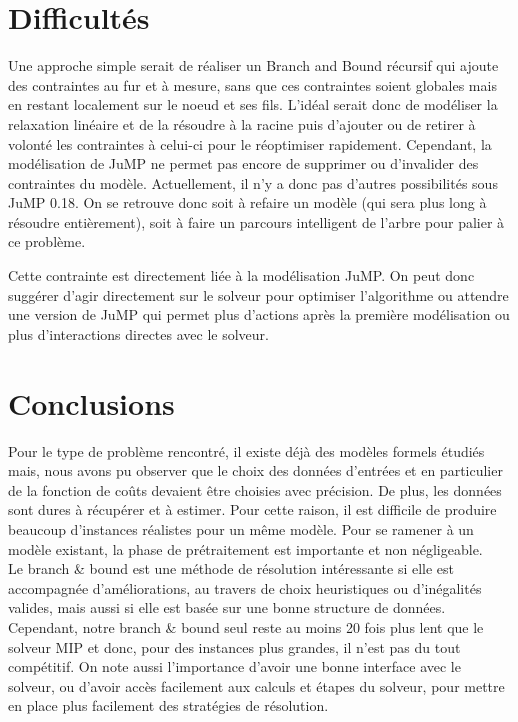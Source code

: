 \documentclass[a4paper,10pt]{article}
\begin{document}
\newpage
\section{Difficultés}
Une approche simple serait de réaliser un Branch and Bound récursif qui ajoute des contraintes au fur et à mesure, sans que ces contraintes soient globales mais en restant localement sur le noeud et ses fils. L'idéal serait donc de modéliser la relaxation linéaire et de la résoudre à la racine puis d'ajouter ou de retirer à volonté les contraintes à celui-ci pour le réoptimiser rapidement. Cependant, la modélisation de JuMP ne permet pas encore de supprimer ou d'invalider des contraintes du modèle. Actuellement, il n'y a donc pas d'autres possibilités sous JuMP 0.18. On se retrouve donc soit à refaire un modèle (qui sera plus long à résoudre entièrement), soit à faire un parcours intelligent de l'arbre pour palier à ce problème.

Cette contrainte est directement liée à la modélisation JuMP. On peut donc suggérer d'agir directement sur le solveur pour optimiser l'algorithme ou attendre une version de JuMP qui permet plus d'actions après la première modélisation ou plus d'interactions directes avec le solveur.

\section{Conclusions}

Pour le type de problème rencontré, il existe déjà des modèles formels étudiés mais, nous avons pu observer que le choix des données d'entrées et en particulier de la fonction de coûts devaient être choisies avec précision. De plus, les données sont dures à récupérer et à estimer. Pour cette raison, il est difficile de produire beaucoup d'instances réalistes pour un même modèle. Pour se ramener à un modèle existant, la phase de prétraitement est importante et non négligeable.\\
Le branch \& bound est une méthode de résolution intéressante si elle est accompagnée d'améliorations, au travers de choix heuristiques ou d'inégalités valides, mais aussi si elle est basée sur une bonne structure de données. Cependant, notre branch \& bound seul reste au moins 20 fois plus lent que le solveur MIP et donc, pour des instances plus grandes, il n'est pas du tout compétitif. On note aussi l'importance d'avoir une bonne interface avec le solveur, ou d'avoir accès facilement aux calculs et étapes du solveur, pour mettre en place plus facilement des stratégies de résolution.




\end{document}
